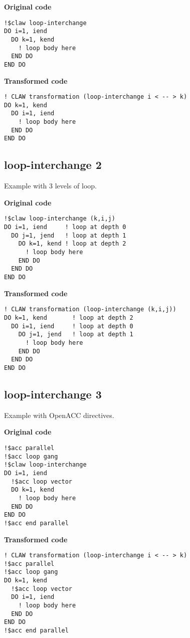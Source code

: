 \documentclass{article}
\begin{document}
\textbf{Original code}
\begin{lstlisting}
!$claw loop-interchange
DO i=1, iend
  DO k=1, kend
    ! loop body here
  END DO
END DO
\end{lstlisting}

\textbf{Transformed code}
\begin{lstlisting}
! CLAW transformation (loop-interchange i < -- > k)
DO k=1, kend
  DO i=1, iend
    ! loop body here
  END DO
END DO
\end{lstlisting}

\subsection{loop-interchange 2}
\label{loop-interchange2}
Example with 3 levels of loop. 

\textbf{Original code}
\begin{lstlisting}
!$claw loop-interchange (k,i,j)
DO i=1, iend     ! loop at depth 0
  DO j=1, jend   ! loop at depth 1
    DO k=1, kend ! loop at depth 2
      ! loop body here
    END DO
  END DO
END DO
\end{lstlisting}

\textbf{Transformed code}
\begin{lstlisting}
! CLAW transformation (loop-interchange (k,i,j))
DO k=1, kend       ! loop at depth 2
  DO i=1, iend     ! loop at depth 0
    DO j=1, jend   ! loop at depth 1
      ! loop body here
    END DO
  END DO
END DO
\end{lstlisting}

\subsection{loop-interchange 3}
\label{loop-interchange3}
Example with OpenACC directives. 

\textbf{Original code}
\begin{lstlisting}
!$acc parallel
!$acc loop gang
!$claw loop-interchange
DO i=1, iend
  !$acc loop vector
  DO k=1, kend
    ! loop body here
  END DO
END DO
!$acc end parallel
\end{lstlisting}

\textbf{Transformed code}
\begin{lstlisting}
! CLAW transformation (loop-interchange i < -- > k)
!$acc parallel
!$acc loop gang
DO k=1, kend
  !$acc loop vector
  DO i=1, iend
    ! loop body here
  END DO
END DO
!$acc end parallel
\end{lstlisting}
\end{document}
